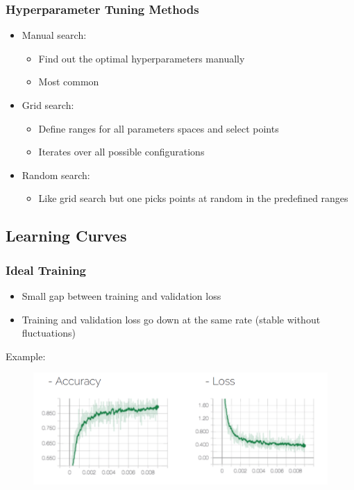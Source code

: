 \documentclass[10pt,a4paper]{article}
\begin{document}
\subsubsection{Hyperparameter Tuning Methods}
\begin{itemize}
	\item Manual search:
	\begin{itemize}
		\item Find out the optimal hyperparameters manually
		\item Most common
	\end{itemize}
	\item Grid search:
	\begin{itemize}
		\item Define ranges for all parameters spaces and select points
		\item Iterates over all possible configurations
	\end{itemize}
	\item Random search:
	\begin{itemize}
		\item Like grid search but one picks points at random in the predefined ranges
	\end{itemize}
\end{itemize}

\subsection{Learning Curves}
\subsubsection{Ideal Training}
\begin{itemize}
	\item Small gap between training and validation loss
	\item Training and validation loss go down at the same rate (stable without fluctuations)
\end{itemize}

Example:
\begin{figure}[H]
	\includegraphics[width=\columnwidth]{figures/l_curves.png}
\end{figure}
\end{document}
